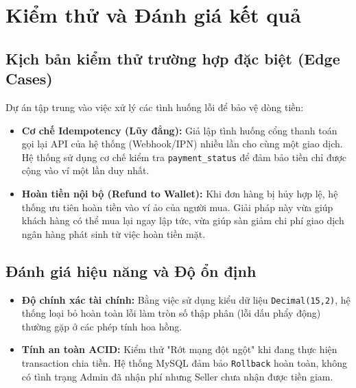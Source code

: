 \documentclass[../main.tex]{subfiles}
\begin{document}
\section{Kiểm thử và Đánh giá kết quả}

\subsection{Kịch bản kiểm thử trường hợp đặc biệt (Edge Cases)}
Dự án tập trung vào việc xử lý các tình huống lỗi để bảo vệ dòng tiền:
\begin{itemize}
    \item \textbf{Cơ chế Idempotency (Lũy đẳng):} Giả lập tình huống cổng thanh toán gọi lại API của hệ thống (Webhook/IPN) nhiều lần cho cùng một giao dịch. Hệ thống sử dụng cơ chế kiểm tra \texttt{payment\_status} để đảm bảo tiền chỉ được cộng vào ví một lần duy nhất.
    \item \textbf{Hoàn tiền nội bộ (Refund to Wallet):} Khi đơn hàng bị hủy hợp lệ, hệ thống ưu tiên hoàn tiền vào ví ảo của người mua. Giải pháp này vừa giúp khách hàng có thể mua lại ngay lập tức, vừa giúp sàn giảm chi phí giao dịch ngân hàng phát sinh từ việc hoàn tiền mặt.
\end{itemize}

\subsection{Đánh giá hiệu năng và Độ ổn định}
\begin{itemize}
    \item \textbf{Độ chính xác tài chính:} Bằng việc sử dụng kiểu dữ liệu \texttt{Decimal(15,2)}, hệ thống loại bỏ hoàn toàn lỗi làm tròn số thập phân (lỗi dấu phẩy động) thường gặp ở các phép tính hoa hồng.
    \item \textbf{Tính an toàn ACID:} Kiểm thử "Rớt mạng đột ngột" khi đang thực hiện transaction chia tiền. Hệ thống MySQL đảm bảo \texttt{Rollback} hoàn toàn, không có tình trạng Admin đã nhận phí nhưng Seller chưa nhận được tiền giam.
\end{itemize}
\end{document}
